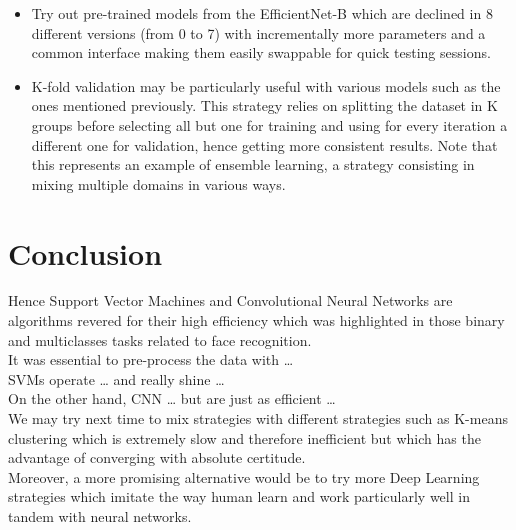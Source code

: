 \documentclass[a4paper,12pt,twoside,twocolumn]{article}
\begin{document}
\begin{itemize}
\item Try out pre-trained models from the EfficientNet-B which are declined in 8 different versions (from 0 to 7) with incrementally more parameters and a common interface making them easily swappable for quick testing sessions.\\
\item K-fold validation may be particularly useful with various models such as the ones mentioned previously. This strategy relies on splitting the dataset in K groups before selecting all but one for training and using for every iteration a different one for validation, hence getting more consistent results. Note that this represents an example of ensemble learning, a strategy consisting in mixing multiple domains in various ways.\\
\end{itemize}

\section{Conclusion}
\label{sec:org3344feb}

Hence Support Vector Machines and Convolutional Neural Networks are algorithms revered for their high efficiency which was highlighted in those binary and multiclasses tasks related to face recognition.\\

It was essential to pre-process the data with \ldots{}\\



SVMs operate \ldots{} and really shine \ldots{}\\



On the other hand, CNN \ldots{} but are just as efficient \ldots{}\\



We may try next time to mix strategies with different strategies such as K-means clustering which is extremely slow and therefore inefficient but which has the advantage of converging with absolute certitude.\\

Moreover, a more promising alternative would be to try more Deep Learning strategies which imitate the way human learn and work particularly well in tandem with neural networks.\\
\end{document}
